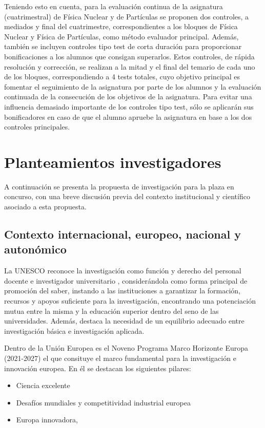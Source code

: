 \documentclass[a4paper,12pt,twoside]{article}
\begin{document}
Teniendo esto en cuenta, para la evaluación continua de la asignatura (cuatrimestral) de Física Nuclear y de Partículas se proponen dos controles, a mediados y final del cuatrimestre, correspondientes a los bloques de Física Nuclear y Física de Partículas, como método evaluador principal. Además, también se incluyen controles tipo test de corta duración para proporcionar bonificaciones a los alumnos que consigan superarlos. Estos controles, de rápida resolución y corrección, se realizan a la mitad y el final del temario de cada uno de los bloques, correspondiendo a 4 tests totales, cuyo objetivo principal es fomentar el seguimiento de la asignatura por parte de los alumnos y la evaluación continuada de la consecución de los objetivos de la asignatura. Para evitar una influencia demasiado importante de los controles tipo test, sólo se aplicarán sus bonificadores en caso de que el alumno apruebe la asignatura en base a los dos controles principales.

\section{Planteamientos investigadores}

A continuación se presenta la propuesta de investigación para la plaza en concurso, con una breve discusión previa del contexto institucional y científico asociado a esta propuesta.

\subsection{Contexto internacional, europeo, nacional y autonómico}

La UNESCO reconoce la investigación como función y derecho del personal docente e investigador universitario \cite{unesco}, considerándola como forma principal de promoción del saber, instando a las instituciones a garantizar la formación, recursos y apoyos suficiente para la investigación, encontrando una potenciación mutua entre la misma y la educación superior dentro del seno de las universidades. Además, destaca la necesidad de un equilibrio adecuado entre investigación básica e investigación aplicada.

Dentro de la Unión Europea es el Noveno Programa Marco Horizonte Europa (2021-2027)\cite{horizonte} el que consituye el marco fundamental para la investigación e innovación europea. En él se destacan los siguientes pilares:

\begin{itemize}
\item Ciencia  excelente
\item Desafíos mundiales y competitividad industrial europea
\item Europa innovadora,
\end{itemize}
\end{document}

